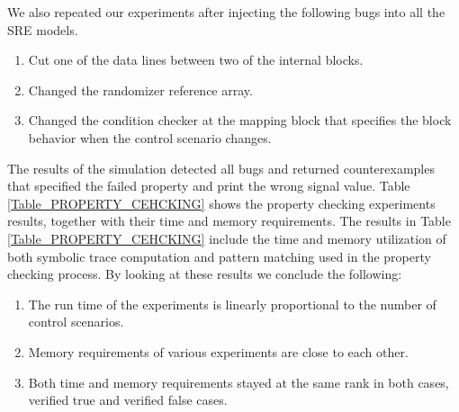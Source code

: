 \documentclass[submission,copyright,creativecommons]{eptcs}
\begin{document}
We also repeated our experiments after injecting the following bugs into all the SRE models.
\begin{enumerate}
  \item Cut one of the data lines between two of the internal blocks.
  \item Changed the randomizer reference array.
  \item Changed the condition checker at the mapping block that specifies the block behavior when the control scenario changes.
\end{enumerate}
The results of the simulation detected all bugs and returned counterexamples that specified the failed property and print the wrong signal value. Table \ref{Table_PROPERTY_CEHCKING} shows the property checking experiments results, together with their time and memory requirements. The results in Table \ref{Table_PROPERTY_CEHCKING} include the time and memory utilization of both symbolic trace computation and pattern matching used in the property checking process. By looking at these results we conclude the following:
\begin{enumerate}
  \item The run time of the experiments is linearly proportional to the number of control scenarios.
  \item Memory requirements of various experiments are close to each other.
  \item Both time and memory requirements stayed at the same rank in both cases, verified true and verified false cases.
\end{enumerate}
\end{document}
